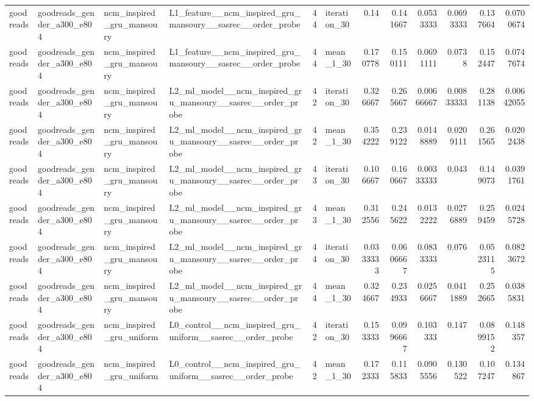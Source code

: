 \begin{table}[htbp!]
\begin{tabular}{llllrlrrrrrr}
goodreads & goodreads\_gender\_a300\_e804 & ncm\_inspired\_gru\_mansoury & L1\_feature\_\_ncm\_inspired\_gru\_mansoury\_\_sasrec\_\_order\_probe & 44 & iteration\_30 & 0.14 & 0.141667 & 0.0533333 & 0.0693333 & 0.137664 & 0.0700674 \\
goodreads & goodreads\_gender\_a300\_e804 & ncm\_inspired\_gru\_mansoury & L1\_feature\_\_ncm\_inspired\_gru\_mansoury\_\_sasrec\_\_order\_probe & 44 & mean\_1\_30 & 0.170778 & 0.150111 & 0.0691111 & 0.0738 & 0.152447 & 0.0747674 \\
goodreads & goodreads\_gender\_a300\_e804 & ncm\_inspired\_gru\_mansoury & L2\_ml\_model\_\_ncm\_inspired\_gru\_mansoury\_\_sasrec\_\_order\_probe & 42 & iteration\_30 & 0.326667 & 0.265667 & 0.00666667 & 0.00833333 & 0.281138 & 0.00642055 \\
goodreads & goodreads\_gender\_a300\_e804 & ncm\_inspired\_gru\_mansoury & L2\_ml\_model\_\_ncm\_inspired\_gru\_mansoury\_\_sasrec\_\_order\_probe & 42 & mean\_1\_30 & 0.354222 & 0.239122 & 0.0148889 & 0.0209111 & 0.261565 & 0.0202438 \\
goodreads & goodreads\_gender\_a300\_e804 & ncm\_inspired\_gru\_mansoury & L2\_ml\_model\_\_ncm\_inspired\_gru\_mansoury\_\_sasrec\_\_order\_probe & 43 & iteration\_30 & 0.106667 & 0.160667 & 0.00333333 & 0.043 & 0.149073 & 0.0391761 \\
goodreads & goodreads\_gender\_a300\_e804 & ncm\_inspired\_gru\_mansoury & L2\_ml\_model\_\_ncm\_inspired\_gru\_mansoury\_\_sasrec\_\_order\_probe & 43 & mean\_1\_30 & 0.312556 & 0.245622 & 0.0132222 & 0.0276889 & 0.259459 & 0.0245728 \\
goodreads & goodreads\_gender\_a300\_e804 & ncm\_inspired\_gru\_mansoury & L2\_ml\_model\_\_ncm\_inspired\_gru\_mansoury\_\_sasrec\_\_order\_probe & 44 & iteration\_30 & 0.0333333 & 0.0606667 & 0.0833333 & 0.076 & 0.0523115 & 0.0823672 \\
goodreads & goodreads\_gender\_a300\_e804 & ncm\_inspired\_gru\_mansoury & L2\_ml\_model\_\_ncm\_inspired\_gru\_mansoury\_\_sasrec\_\_order\_probe & 44 & mean\_1\_30 & 0.324667 & 0.234933 & 0.0256667 & 0.0411889 & 0.252665 & 0.0385831 \\
goodreads & goodreads\_gender\_a300\_e804 & ncm\_inspired\_gru\_uniform & L0\_control\_\_ncm\_inspired\_gru\_uniform\_\_sasrec\_\_order\_probe & 42 & iteration\_30 & 0.153333 & 0.0996667 & 0.103333 & 0.147 & 0.0899152 & 0.148357 \\
goodreads & goodreads\_gender\_a300\_e804 & ncm\_inspired\_gru\_uniform & L0\_control\_\_ncm\_inspired\_gru\_uniform\_\_sasrec\_\_order\_probe & 42 & mean\_1\_30 & 0.172333 & 0.115833 & 0.0905556 & 0.130522 & 0.107247 & 0.134867 \\

\end{tabular}
\end{table}
